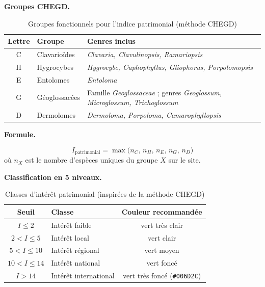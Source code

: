 \documentclass[11pt,a4paper]{article}
\begin{document}
\medskip
\noindent\textbf{Groupes CHEGD.}\par

\begin{table}[htbp]
  \centering
  \caption{Groupes fonctionnels pour l'indice patrimonial (méthode CHEGD)}
  \begin{tabularx}{\textwidth}{clX}
    \toprule
    \textbf{Lettre} & \textbf{Groupe} & \textbf{Genres inclus} \\
    \midrule
    C & Clavarioïdes & \textit{Clavaria, Clavulinopsis, Ramariopsis} \\
    H & Hygrocybes   & \textit{Hygrocybe, Cuphophyllus, Gliophorus, Porpolomopsis} \\
    E & Entolomes    & \textit{Entoloma} \\
    G & Géoglossacées & Famille \textit{Geoglossaceae} ; genres \textit{Geoglossum, Microglossum, Trichoglossum} \\
    D & Dermolomes   & \textit{Dermoloma, Porpoloma, Camarophyllopsis} \\
    \bottomrule
  \end{tabularx}
\end{table}

\medskip
\noindent\textbf{Formule.}\par

\begin{formulebox}
  \[
    I_{\text{patrimonial}} = \max\!\bigl(n_C,\, n_H,\, n_E,\, n_G,\, n_D\bigr)
  \]
  où $n_X$ est le nombre d'espèces uniques du groupe $X$ sur le site.
\end{formulebox}

\medskip
\noindent\textbf{Classification en 5 niveaux.}\par

\begin{table}[htbp]
  \centering
  \caption{Classes d'intérêt patrimonial (inspirées de la méthode CHEGD)}
  \begin{tabular}{clc}
    \toprule
    \textbf{Seuil} & \textbf{Classe} & \textbf{Couleur recommandée} \\
    \midrule
    $I \leq 2$         & Intérêt faible         & vert très clair \\
    $2 < I \leq 5$     & Intérêt local          & vert clair \\
    $5 < I \leq 10$    & Intérêt régional       & vert moyen \\
    $10 < I \leq 14$   & Intérêt national       & vert foncé \\
    $I > 14$           & Intérêt international  & vert très foncé (\texttt{\#006D2C}) \\
    \bottomrule
  \end{tabular}
\end{table}
\end{document}
